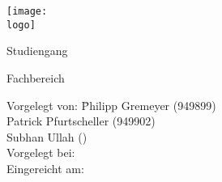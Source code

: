 \begin{titlepage}

\begin{minipage}{\textwidth}
		\noindent \hfill \texttt{[image: \\logo]}
\end{minipage}
\vspace{6em}

\begin{center}
    {\huge \art}
    
    {\Large Studiengang \studiengang}
    
    \vspace{4em}
    
    \textbf{{\Large \titel}}
    
    \vspace{4em}
    
    \hochschule
    
    \hochschulezusatz

    Fachbereich \fachbereich
    
    \vspace{6em}

	\begin{minipage}{\textwidth}
		\begin{tabbing}
		
		Vorgelegt von:  \hspace*{2em}\= Philipp Gremeyer (949899) \\%
        \> Patrick Pfurtscheller (949902) \\
        \> Subhan Ullah () \\
        Vorgelegt bei: \> \betreuer \\
        Eingereicht am: \> \datumAbgabe
		\end{tabbing}

	\end{minipage}
\end{center}
\end{titlepage}
